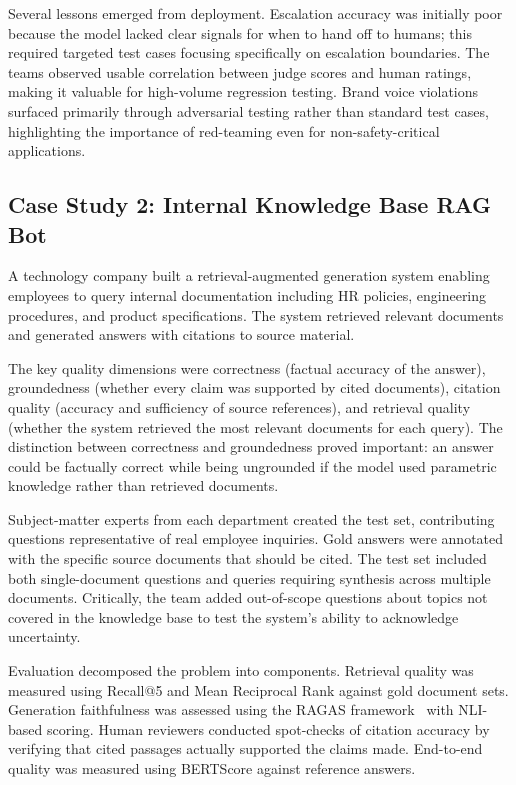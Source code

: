 Several lessons emerged from deployment. Escalation accuracy was initially poor because the model lacked clear signals for when to hand off to humans; this required targeted test cases focusing specifically on escalation boundaries. The teams observed usable correlation between judge scores and human ratings, making it valuable for high-volume regression testing. Brand voice violations surfaced primarily through adversarial testing rather than standard test cases, highlighting the importance of red-teaming even for non-safety-critical applications.

\subsection{Case Study 2: Internal Knowledge Base RAG Bot}

A technology company built a retrieval-augmented generation system enabling employees to query internal documentation including HR policies, engineering procedures, and product specifications. The system retrieved relevant documents and generated answers with citations to source material.

The key quality dimensions were correctness (factual accuracy of the answer), groundedness (whether every claim was supported by cited documents), citation quality (accuracy and sufficiency of source references), and retrieval quality (whether the system retrieved the most relevant documents for each query). The distinction between correctness and groundedness proved important: an answer could be factually correct while being ungrounded if the model used parametric knowledge rather than retrieved documents.

Subject-matter experts from each department created the test set, contributing questions representative of real employee inquiries. Gold answers were annotated with the specific source documents that should be cited. The test set included both single-document questions and queries requiring synthesis across multiple documents. Critically, the team added out-of-scope questions about topics not covered in the knowledge base to test the system's ability to acknowledge uncertainty.

Evaluation decomposed the problem into components. Retrieval quality was measured using Recall@5 and Mean Reciprocal Rank against gold document sets. Generation faithfulness was assessed using the RAGAS framework~\citep{es2024ragas} with NLI-based scoring. Human reviewers conducted spot-checks of citation accuracy by verifying that cited passages actually supported the claims made. End-to-end quality was measured using BERTScore against reference answers.

